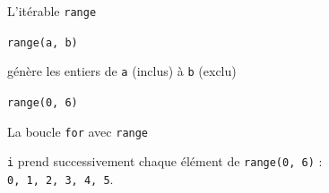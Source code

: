 \documentclass{beamer}
\begin{document}
\begin{frame}{L'itérable \texttt{range}}
	\begin{center}
		\Large \texttt{range(a, b)}
	\end{center}
	\begin{center}
		génère les entiers de \texttt{a} (inclus) à \texttt{b} (exclu)
	\end{center}
	
	\pause
	\vspace{0.3cm}
	\begin{center}
		\Large \texttt{range(0, 6)}
	\end{center}
	
	\pause
	\vspace{0.3cm}
	\begin{center}
	\end{center}
\end{frame}

\begin{frame}{La boucle \texttt{for} avec \texttt{range}}
	

	\pause
	\begin{center}
		\texttt{i} prend successivement chaque \textcolor{red!70!black}{élément} de \texttt{range(0, 6)} :\\
		 \texttt{0, 1, 2, 3, 4, 5}.
	\end{center}
	
	
\end{frame}
\end{document}
